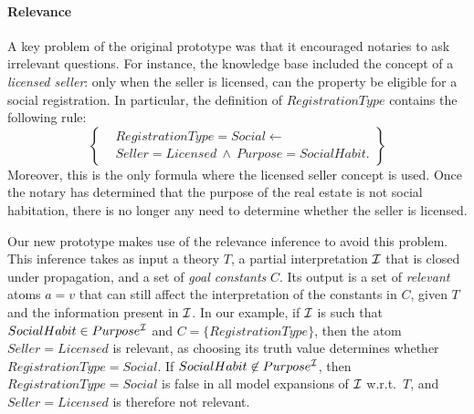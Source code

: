 \paragraph{Relevance}
\label{sec:relevance}
A key problem of the original prototype was that it encouraged notaries to ask irrelevant questions. For instance, the knowledge base included the concept of a \emph{licensed seller}: only when the seller is licensed, can the property be eligible for a social registration. In particular, the definition of $RegistrationType$ contains the following rule:
\[\left\{\begin{aligned}
 & RegistrationType = Social \leftarrow \\ 
 & Seller=Licensed~\land~Purpose=SocialHabit.
\end{aligned}\right\}\]
Moreover, this is the only formula where the licensed seller concept is used. Once the notary has determined that the purpose of the real estate is not social habitation, there is no longer any need to determine whether the seller is licensed. %



Our new prototype makes use of the relevance inference to avoid this problem. This inference takes as input a theory $T$, a partial interpretation $\mathcal{I}$ that is closed under propagation, and a set of \emph{goal constants} $C$. 
Its output is a set of \emph{relevant} atoms $a=v$ that can still affect the interpretation of the constants in $C$, given $T$ and the information present in $\mathcal{I}$. 
In our example, if $\mathcal{I}$ is such that $SocialHabit \in Purpose^{\mathcal{I}}$ and $C = \{RegistrationType\}$, then the atom $Seller = Licensed$ is relevant, as choosing its truth value determines whether $RegistrationType=Social$.
If $SocialHabit \not\in Purpose^{\mathcal{I}}$, then $RegistrationType=Social$ is false in all model expansions of $\mathcal{I}$ w.r.t.~$T$, and $Seller = Licensed$ is therefore not relevant.

